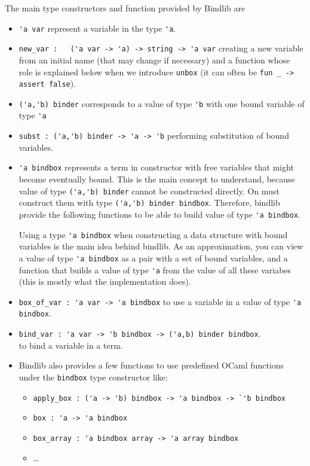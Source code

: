 \documentclass[11pt]{article}
\begin{document}
The main type constructors and function provided by Bindlib are
\begin{itemize}
\item \verb#'a var# represent a variable in the type \verb#'a#.

\item \verb#new_var :   ('a var -> 'a) -> string -> 'a var#
  creating a new variable from an initial name (that may change if
  necessary) and a function whose role is explained below when we
  introduce \verb#unbox#
    (it can often be \verb#fun _ -> assert false#).

\item \verb#('a,'b) binder# corresponds to a value of type \verb#'b# with one bound variable of type
  \verb#'a#
\item \verb#subst : ('a,'b) binder -> 'a -> 'b# performing
  substitution of bound variables.

\item \verb#'a bindbox# represents a term in constructor with free
  variables that might become eventually bound. This is
  the main concept to understand, because value of type
  \verb#('a,'b) binder# cannot be constructed directly. On must
  construct them with type \verb#('a,'b) binder bindbox#. Therefore,
  bindlib provide the following functions to be able to build value of
  type \verb#'a bindbox#.

  Using a type \verb!'a bindbox! when constructing a data structure
  with bound variables is the main idea behind bindlib. As an
  approximation, you can view a value of type \verb!'a bindbox! as a
  pair with a set of bound variables, and a function that builds a
  value of type \verb!'a! from the value of all these variabes (this
  is mostly what the implementation does).

\item \verb#box_of_var : 'a var -> 'a bindbox# to use a variable
  in a value of type \verb#'a bindbox#.

\item
  \verb#bind_var : 'a var -> 'b bindbox -> ('a,b) binder bindbox#.\\
  to bind a variable in a term.

\item Bindlib also provides a few functions to use predefined OCaml
  functions under the \verb#bindbox# type constructor like:
  \begin{itemize}
  \item
    \verb#apply_box : ('a -> 'b) bindbox -> 'a bindbox -> `'b bindbox#
  \item \verb#box : 'a -> 'a bindbox#
  \item \verb#box_array : 'a bindbox array -> 'a array bindbox#
  \item …
  \end{itemize}


\end{itemize}
\end{document}
